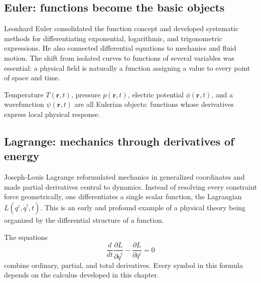 \subsection{Euler: functions become the basic objects}
\begin{historicalnote}
Leonhard Euler consolidated the function concept and developed systematic
methods for differentiating exponential, logarithmic, and trigonometric
expressions.  He also connected differential equations to mechanics and fluid
motion.  The shift from isolated curves to functions of several variables was
essential: a physical field is naturally a function assigning a value to every
point of space and time.
\end{historicalnote}
\begin{bookinsight}
Temperature $T(\mathbf r,t)$, pressure $p(\mathbf r,t)$, electric potential
$\phi(\mathbf r,t)$, and a wavefunction $\psi(\mathbf r,t)$ are all Eulerian
objects: functions whose derivatives express local physical response.
\end{bookinsight}

\subsection{Lagrange: mechanics through derivatives of energy}
\begin{historicalnote}
Joseph-Louis Lagrange reformulated mechanics in generalized coordinates and
made partial derivatives central to dynamics.  Instead of resolving every
constraint force geometrically, one differentiates a single scalar function,
the Lagrangian $L(q^i,\dot q^i,t)$.  This is an early and profound example of a
physical theory being organized by the differential structure of a function.
\end{historicalnote}
\begin{bookinsight}
The equations
\[
\frac{d}{dt}\frac{\partial L}{\partial \dot q^i}
-\frac{\partial L}{\partial q^i}=0
\]
combine ordinary, partial, and total derivatives.  Every symbol in this
formula depends on the calculus developed in this chapter.
\end{bookinsight}

